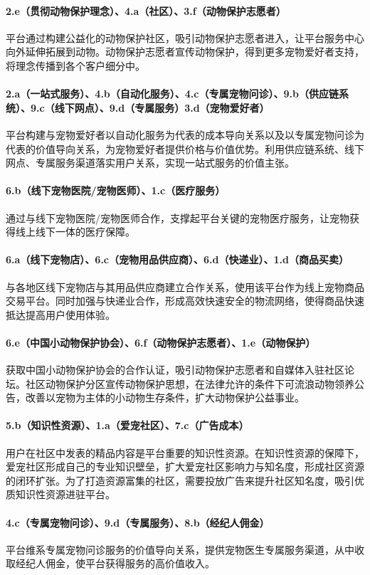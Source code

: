 \documentclass[a4paper]{ctexart}
\begin{document}
\paragraph{2.e（贯彻动物保护理念）、4.a（社区）、3.f（动物保护志愿者）}平台通过构建公益化的动物保护社区，吸引动物保护志愿者进入，让平台服务中心向外延伸拓展到动物。动物保护志愿者宣传动物保护，得到更多宠物爱好者支持，将理念传播到各个客户细分中。
\paragraph{2.a（一站式服务）、4.b（自动化服务）、4.c（专属宠物问诊）、9.b（供应链系统）、9.c（线下网点）、9.d（专属服务）3.d（宠物爱好者）}平台构建与宠物爱好者以自动化服务为代表的成本导向关系以及以专属宠物问诊为代表的价值导向关系，为宠物爱好者提供价格与价值优势。利用供应链系统、线下网点、专属服务渠道落实用户关系，实现一站式服务的价值主张。
\paragraph{6.b（线下宠物医院/宠物医师）、1.c（医疗服务）}通过与线下宠物医院/宠物医师合作，支撑起平台关键的宠物医疗服务，让宠物获得线上线下一体的医疗保障。
\paragraph{6.a（线下宠物店）、6.c（宠物用品供应商）、6.d（快递业）、1.d（商品买卖）}与各地区线下宠物店与其用品供应商建立合作关系，使用该平台作为线上宠物商品交易平台。同时加强与快递业合作，形成高效快速安全的物流网络，使得商品快速抵达提高用户使用体验。
\paragraph{6.e（中国小动物保护协会）、6.f（动物保护志愿者）、1.e（动物保护）}获取中国小动物保护协会的合作认证，吸引动物保护志愿者和自媒体入驻社区论坛。社区动物保护分区宣传动物保护思想，在法律允许的条件下可流浪动物领养公告，改善以宠物为主体的小动物生存条件，扩大动物保护公益事业。
\paragraph{5.b（知识性资源）、1.a（爱宠社区）、7.c（广告成本）}用户在社区中发表的精品内容是平台重要的知识性资源。在知识性资源的保障下，爱宠社区形成自己的专业知识壁垒，扩大爱宠社区影响力与知名度，形成社区资源的闭环扩张。为了打造资源富集的社区，需要投放广告来提升社区知名度，吸引优质知识性资源进驻平台。
\paragraph{4.c（专属宠物问诊）、9.d（专属服务）、8.b（经纪人佣金）}平台维系专属宠物问诊服务的价值导向关系，提供宠物医生专属服务渠道，从中收取经纪人佣金，使平台获得服务的高价值收入。
\end{document}
